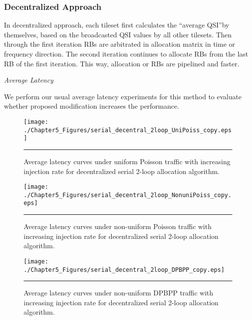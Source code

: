 \subsubsection{Decentralized Approach}
In decentralized approach, each tileset first calculates the \textquotedblleft average QSI\textquotedblright by themselves, based on the broadcasted QSI values by all other tilesets. Then through the first iteration RBs are arbitrated in allocation matrix in time or frequency direction. The second iteration continues to allocate RBs from the last RB of the first iteration. This way, allocation or RBs are pipelined and faster.

\textit{Average Latency}

We perform our usual average latency experiments for this method to evaluate whether proposed modification increases the performance. 



\begin{figure}[htbp]
  \centering
    \texttt{[image: ./Chapter5\_Figures/serial\_decentral\_2loop\_UniPoiss\_copy.eps]}
    \rule{35em}{0.5pt}
  \caption[Decentralized Serial 2-loop allocation average latency under uniform Poisson]{Average latency curves under uniform Poisson traffic with increasing injection rate for decentralized serial 2-loop allocation algorithm.}
  \label{fig:Electron}
\end{figure}


\begin{figure}[htbp]
  \centering
    \texttt{[image: ./Chapter5\_Figures/serial\_decentral\_2loop\_NonuniPoiss\_copy.eps]}
    \rule{35em}{0.5pt}
  \caption[Decentralized Serial 2-loop allocation average latency under non-uniform Poisson]{Average latency curves under non-uniform Poisson traffic with increasing injection rate for decentralized serial 2-loop allocation algorithm.}
  \label{fig:Electron}
\end{figure}


\begin{figure}[htbp]
  \centering
    \texttt{[image: ./Chapter5\_Figures/serial\_decentral\_2loop\_DPBPP\_copy.eps]}
    \rule{35em}{0.5pt}
  \caption[Decentralized Serial 2-loop allocation average latency under non-uniform DPBPP]{Average latency curves under non-uniform DPBPP traffic with increasing injection rate for decentralized serial 2-loop allocation algorithm.}
  \label{fig:Electron}
\end{figure}

